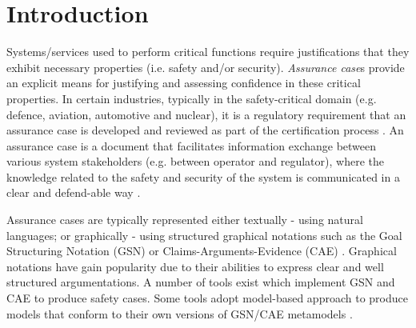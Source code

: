 \section{Introduction}
Systems/services used to perform critical functions require justifications that they exhibit necessary properties (i.e. safety and/or security). 
\textit{Assurance case}s provide an explicit means for justifying and assessing confidence in these critical properties. 
In certain industries, typically in the safety-critical domain (e.g. defence, aviation, automotive and nuclear), it is a regulatory requirement that an assurance case is developed and reviewed as part of the certification process \cite{healthFound}.
An assurance case is a document that facilitates information exchange between various system stakeholders (e.g. between operator and regulator), where the knowledge related to the safety and security of the system is communicated in a clear and defend-able way \cite{hawkins2013assurance}. 

Assurance cases are typically represented either textually - using natural languages; or graphically - using structured graphical notations such as the Goal Structuring Notation (GSN) \cite{kelly2004goal} or Claims-Arguments-Evidence (CAE) \cite{cae}. 
Graphical notations have gain popularity due to their abilities to express clear and well structured argumentations.
A number of tools exist which implement GSN \cite{denney2017tool, matsuno2010dependability, netkachova2014tool, larrucea2017supporting, barry2011certware, yorkgsn} and CAE \cite{denney2017tool, barry2011certware} to produce safety cases. 
Some tools adopt model-based approach to produce models that conform to their own versions of GSN/CAE metamodels \cite{barry2011certware, larrucea2017supporting}.


